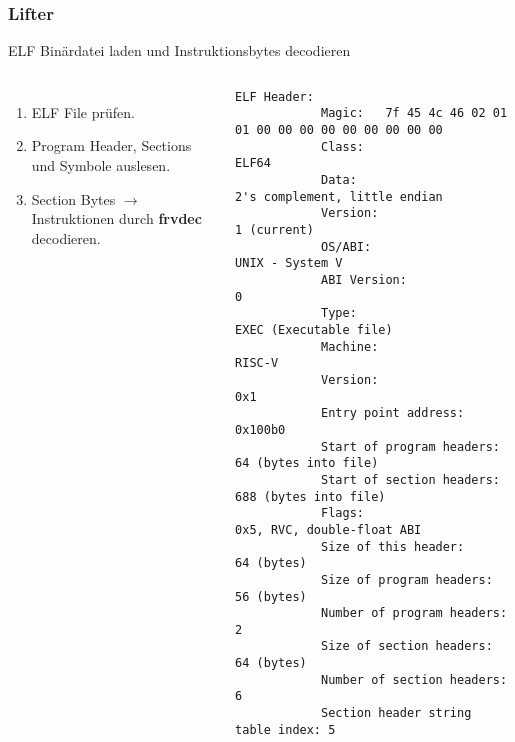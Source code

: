 \begin{frame}[fragile]
    \frametitle{Lifter}{ELF Binärdatei laden und Instruktionsbytes decodieren}

    \begin{columns}[c]

        \begin{enumerate}
            \item ELF File prüfen.
            \item Program Header, Sections und Symbole auslesen.
            \item Section Bytes $\rightarrow$ Instruktionen durch \textbf{frvdec} decodieren.
        \end{enumerate}

        \begin{lstlisting}[basicstyle=\tiny, breaklines=true]
        ELF Header:
            Magic:   7f 45 4c 46 02 01 01 00 00 00 00 00 00 00 00 00 
            Class:                             ELF64
            Data:                              2's complement, little endian
            Version:                           1 (current)
            OS/ABI:                            UNIX - System V
            ABI Version:                       0
            Type:                              EXEC (Executable file)
            Machine:                           RISC-V
            Version:                           0x1
            Entry point address:               0x100b0
            Start of program headers:          64 (bytes into file)
            Start of section headers:          688 (bytes into file)
            Flags:                             0x5, RVC, double-float ABI
            Size of this header:               64 (bytes)
            Size of program headers:           56 (bytes)
            Number of program headers:         2
            Size of section headers:           64 (bytes)
            Number of section headers:         6
            Section header string table index: 5
        \end{lstlisting}
    \end{columns}
\end{frame}
\clearpage


